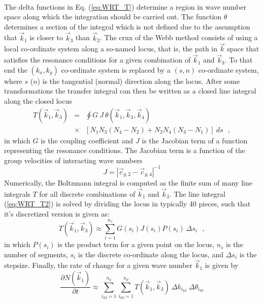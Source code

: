 \documentclass[12pt]{book}
\begin{document}
\nocite{Her80H}
\\[2ex]
\noindent
The delta functions in Eq. (\ref{eq:WRT_T}) determine a region in
wave number space along which the integration should be carried out.
The function $\theta$ determines a section of the integral which is
not defined due to the assumption that
$\vec{k}_1$ is closer to $\vec{k}_3$ than $\vec{k}_2$. The crux of the Webb method
consists of using a local co-ordinate system along a so-named
locus, that is, the path in $\vec{k}$ space that satisfies the resonance conditions for a given combination
of $\vec{k}_1$ and $\vec{k}_3$. To that end the $(k_{x},k_{y})$ co-ordinate system is
replaced by a $(s,n)$ co-ordinate system, where $s$ ($n$) is the tangential (normal) direction
along the locus. After some
transformations the transfer integral can then be written as a closed
line integral along the closed locus
\begin{eqnarray}
T \left( \vec{k}_1 ,\vec{k}_3 \right) & = & \oint G \: J
\: \theta ( \vec{k}_1 , \vec{k}_3 , \vec{k}_4 ) \nonumber \\
& \times & \left [ N_1 N_3 \left ( N_4 - N_2 \right ) + N_2 N_4 \left
(
N_3  - N_1 \right ) \right ] \: d s  \:\:\: , \label{eq:WRT_T2}
\end{eqnarray}
in which $G$ is the coupling coefficient and $J$
is the Jacobian term of a function representing the resonance conditions.
The Jacobian term is a function of the group velocities of interacting wave
numbers
\begin{equation}
  J = | \vec{c}_{g,2} - \vec{c}_{g,4}|^{-1}
\end{equation}
Numerically, the Boltzmann integral is computed as the finite sum of
many line integrals $T$ for all discrete combinations of $\vec{k}_1$ and
$\vec{k}_3$. The line integral (\ref{eq:WRT_T2}) is solved by dividing the
locus in typically 40 pieces, such that it's discretized version is
given as:
\begin{equation}
T\left( {\vec{k}_1 ,\vec{k}_3 } \right) \approx \sum_{i=1}^{n_s } G(s_i)
J(s_i) P(s_i) \: \Delta s_i \:\:\: ,
\end{equation}
in which $P(s_i)$ is the product term for a given point on the locus,
$n_s$ is the number of segments, $s_i$ is the discrete co-ordinate
along the locus, and $\Delta s_i$ is the stepsize. Finally, the rate
of change for a given wave number $\vec{k}_1 $ is given by
\begin{equation}
\frac{\partial N(\vec{k}_1)}{\partial t} \approx \sum_{i_{k3}  = 1}^{n_k }
{\sum_{i_{\theta 3}  = 1}^{n_\theta  } T(\vec{k}_1,\vec{k}_3) \: \Delta
k_{i_{k3}} \: \Delta \theta_{i_{\theta 3} } } \label{eq:WRT_numT}
\end{equation}
\end{document}
